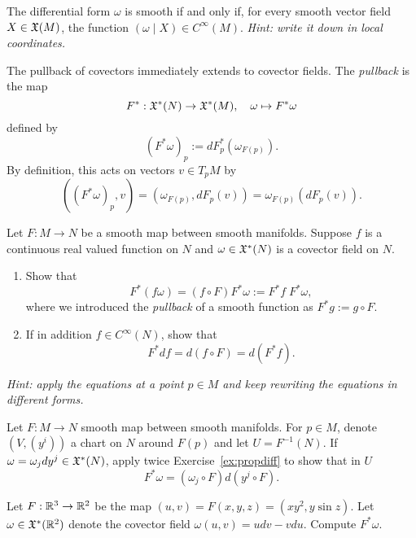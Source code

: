 \begin{exercise}
  The differential form $\omega$ is smooth if and only if, for every smooth vector field $X\in\mathfrak{X}(M)$, the function $(\omega \mid X)\in C^\infty(M)$.
  \textit{\small Hint: write it down in local coordinates.}
\end{exercise}

\begin{definition}\label{def:pullback1f}
  The pullback of covectors immediately extends to covector fields.
  The \emph{pullback} is the map
  \begin{equation}
    F^*: \mathfrak{X}^*(N) \to \mathfrak{X}^*(M), \quad \omega \mapsto F^* \omega
  \end{equation}
  defined by
  \begin{equation}
    (F^*\omega)_p := dF_p^*(\omega_{F(p)}).
  \end{equation}
  By definition, this acts on vectors $v\in T_p M$ by
  \begin{equation}
    ((F^*\omega)_p, v) = (\omega_{F(p)}, dF_p(v)) = \omega_{F(p)}(dF_p(v)).
  \end{equation}
\end{definition}

\begin{exercise}\label{ex:propdiff}
  Let $F:M\to N$ be a smooth map between smooth manifolds.
  Suppose $f$ is a continuous real valued function on $N$ and $\omega\in\mathfrak{X}^*(N)$ is a covector field on $N$.
  \begin{enumerate}
    \item Show that
          \begin{equation}
            F^*(f\omega) = (f\circ F)F^*\omega := F^* f\; F^*\omega,
          \end{equation}
          where we introduced the \emph{pullback} of a smooth function as $F^*g := g\circ F$.
    \item If in addition $f\in C^\infty(N)$, show that
          \begin{equation}
            F^* df = d (f\circ F) = d (F^* f).
          \end{equation}
  \end{enumerate}
  \textit{\small Hint: apply the equations at a point $p\in M$ and keep rewriting the equations in different forms.}
\end{exercise}

\begin{exercise}
  Let $F:M\to N$ smooth map between smooth manifolds.
  For $p\in M$, denote $(V, (y^i))$ a chart on $N$ around $F(p)$ and let $U=F^{-1}(N)$.
  If $\omega = \omega_j dy^j \in\mathfrak{X}^*(N)$, apply twice Exercise~\ref{ex:propdiff} to show that in $U$
  \begin{equation}
    F^*\omega = (\omega_j\circ F) d(y^j \circ F).
  \end{equation}

  Let $F:\mathbb{R}^3\to\mathbb{R}^2$ be the map $(u,v) = F(x,y,z) = (x y^2, y \sin z)$.
  Let $\omega\in\mathfrak{X}^*(\mathbb{R}^2)$ denote the covector field $\omega(u,v) = u dv - v du$.
  Compute $F^* \omega$.
\end{exercise}

